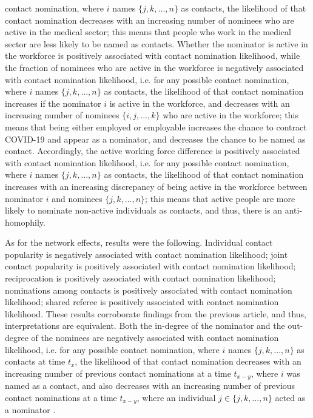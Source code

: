 contact nomination, where $i$ names $\{j,k,...,n\}$ as contacts, the likelihood of that contact nomination decreases with an increasing number of nominees who are active in the medical sector; this means that people who work in the medical sector are less likely to be named as contacts.  Whether the nominator is active in the workforce is positively associated with contact nomination likelihood, while the fraction of nominees who are active in the workforce is negatively associated with contact nomination likelihood, i.e. for any possible contact nomination, where $i$ names $\{j,k,...,n\}$ as contacts, the likelihood of that contact nomination increases if the nominator $i$ is active in the workforce, and decreases with an increasing number of nominees $\{i,j,...,k\}$ who are active in the workforce; this means that being either employed or employable increases the chance to contract COVID-19 and appear as a nominator, and decreases the chance to be named as contact. Accordingly, the active working force difference is positively associated with contact nomination likelihood, i.e. for any possible contact nomination, where $i$ names $\{j,k,...,n\}$ as contacts, the likelihood of that contact nomination increases with an increasing discrepancy of being active in the workforce between nominator $i$ and nominees $\{j,k,...,n\}$; this means that active people are more likely to nominate non-active individuals as contacts, and thus, there is an anti-homophily. 

As for the network effects, results were the following. Individual contact popularity is negatively associated with contact nomination likelihood; joint contact popularity is positively associated with contact nomination likelihood; reciprocation is positively associated with contact nomination likelihood; nominations among contacts is positively associated with contact nomination likelihood; shared referee is positively associated with contact nomination likelihood. These results corroborate findings from the previous article, and thus, interpretations are equivalent. Both the in-degree of the nominator and the out-degree of the nominees are negatively associated with contact nomination likelihood, i.e. for any possible contact nomination, where $i$ names $\{j,k,...,n\}$ as contacts at time $t_x$, the likelihood of that contact nomination decreases with an increasing number of previous contact nominations at a time $t_{x-y}$, where $i$ was named as a contact, and also decreases with an increasing number of previous contact nominations at a time $t_{x-y}$, where an individual $j \in \{j,k,...,n\}$ acted as a nominator \cite{hancean2021role,hancean2022occupations}. 


